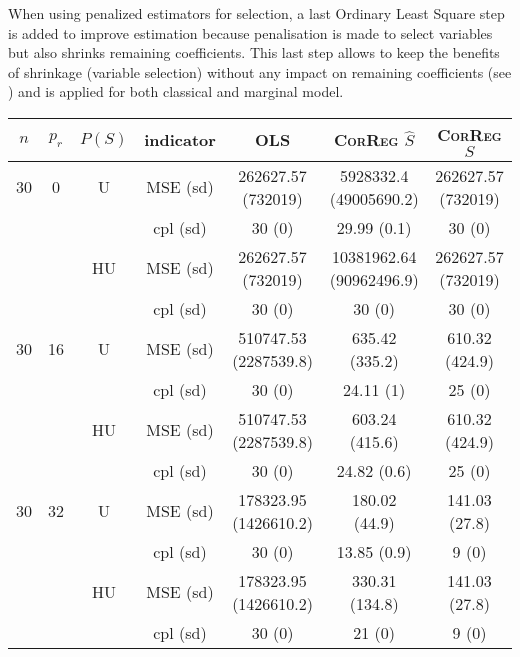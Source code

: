 \documentclass[11pt,a4paper]{article}
\begin{document}
When using penalized estimators for selection, a last Ordinary Least Square step is added to improve estimation because penalisation is made to select variables but also shrinks remaining coefficients. This last step allows to keep the benefits of shrinkage (variable selection) without any impact on remaining coefficients (see \cite{SAM10088}) and is applied for both classical and marginal model.
\begin{table}[h!]
\centering
\begin{tabular}{|c|c|c|c|c|c|c|}
\hline 
$n$ & $p_r$& $P(S)$ & indicator &OLS  &    \textsc{CorReg} $\hat S$& \textsc{CorReg} $S$\\ 
\hline %
30 & 0 & U& MSE (sd) & 262627.57 (732019) & 5928332.4 (49005690.2) & 262627.57 (732019) \\
& & & cpl (sd) & 30 (0) & 29.99 (0.1) & 30 (0) \\
 &  &HU &MSE (sd) & 262627.57 (732019) & 10381962.64 (90962496.9) & 262627.57 (732019) \\
& & & cpl (sd) & 30 (0) & 30 (0) & 30 (0) \\
\hline %
30 & 16 & U&MSE (sd) & 510747.53 (2287539.8) & 635.42 (335.2) & 610.32 (424.9) \\
& & & cpl (sd) & 30 (0) & 24.11 (1) & 25 (0) \\
 &  &HU &MSE (sd) & 510747.53 (2287539.8) & 603.24 (415.6) & 610.32 (424.9) \\
& & & cpl (sd) & 30 (0) & 24.82 (0.6) & 25 (0) \\
\hline %
30 & 32 & U & MSE (sd) & 178323.95 (1426610.2) & 180.02 (44.9) & 141.03 (27.8) \\
& & & cpl (sd) & 30 (0) & 13.85 (0.9) & 9 (0) \\
 &  & HU & MSE (sd) & 178323.95 (1426610.2) & 330.31 (134.8) & 141.03 (27.8) \\
& & & cpl (sd) & 30 (0) & 21 (0) & 9 (0) \\
\hline
\hline %

\end{tabular}
\end{table}
\end{document}
